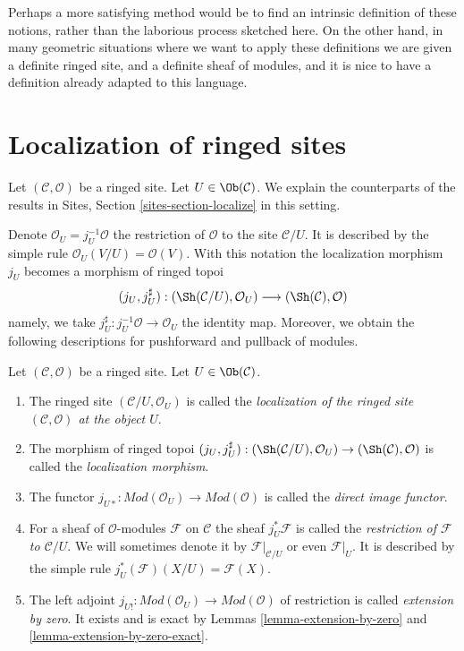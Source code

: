\medskip\noindent
Perhaps a more satisfying method would be to find an intrinsic definition
of these notions, rather than the laborious process sketched here.
On the other hand, in many geometric situations where we want to apply
these definitions we are given a definite ringed site, and a definite
sheaf of modules, and it is nice to have a definition already adapted to
this language.




\section{Localization of ringed sites}
\label{section-localize}

\noindent
Let $(\mathcal{C}, \mathcal{O})$ be a ringed site.
Let $U \in \Ob(\mathcal{C})$.
We explain the counterparts of the results in
Sites, Section \ref{sites-section-localize}
in this setting.

\medskip\noindent
Denote
$\mathcal{O}_U = j_U^{-1}\mathcal{O}$ the restriction of $\mathcal{O}$
to the site $\mathcal{C}/U$. It is described by the simple
rule $\mathcal{O}_U(V/U) = \mathcal{O}(V)$. With this notation
the localization morphism $j_U$ becomes a morphism of ringed topoi
$$
(j_U, j_U^\sharp) :
(\Sh(\mathcal{C}/U), \mathcal{O}_U)
\longrightarrow
(\Sh(\mathcal{C}), \mathcal{O})
$$
namely, we take $j_U^\sharp : j_U^{-1}\mathcal{O} \to \mathcal{O}_U$
the identity map.
Moreover, we obtain the following descriptions for pushforward
and pullback of modules.

\begin{definition}
\label{definition-localize-ringed-site}
Let $(\mathcal{C}, \mathcal{O})$ be a ringed site.
Let $U \in \Ob(\mathcal{C})$.
\begin{enumerate}
\item The ringed site $(\mathcal{C}/U, \mathcal{O}_U)$ is called the
{\it localization of the ringed site $(\mathcal{C}, \mathcal{O})$
at the object $U$}.
\item The morphism of ringed topoi
$(j_U, j_U^\sharp) :
(\Sh(\mathcal{C}/U), \mathcal{O}_U)
\to
(\Sh(\mathcal{C}), \mathcal{O})$
is called the {\it localization morphism}.
\item The functor
$j_{U*} : \textit{Mod}(\mathcal{O}_U) \to \textit{Mod}(\mathcal{O})$
is called the {\it direct image functor}.
\item For a sheaf of $\mathcal{O}$-modules $\mathcal{F}$ on $\mathcal{C}$
the sheaf $j_U^*\mathcal{F}$ is called the
{\it restriction of $\mathcal{F}$ to $\mathcal{C}/U$}.
We will sometimes denote it by
$\mathcal{F}|_{\mathcal{C}/U}$ or even $\mathcal{F}|_U$.
It is described by the simple rule $j_U^*(\mathcal{F})(X/U) = \mathcal{F}(X)$.
\item The left adjoint
$j_{U!} : \textit{Mod}(\mathcal{O}_U) \to \textit{Mod}(\mathcal{O})$
of restriction is called {\it extension by zero}. It exists and is
exact by
Lemmas \ref{lemma-extension-by-zero} and
\ref{lemma-extension-by-zero-exact}.
\end{enumerate}
\end{definition}

